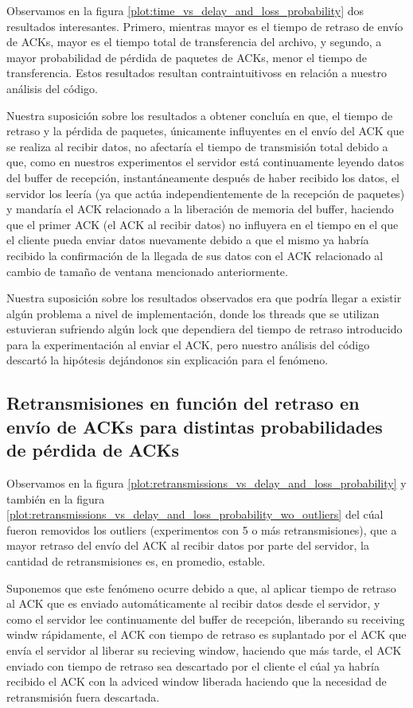 \documentclass[a4paper, 10pt, twoside]{article}
\begin{document}
Observamos en la figura \ref{plot:time_vs_delay_and_loss_probability} dos resultados interesantes. Primero, mientras mayor es el tiempo de retraso de envío de ACKs, mayor es el tiempo total de transferencia del archivo, y segundo, a mayor probabilidad de pérdida de paquetes de ACKs, menor el tiempo de transferencia. Estos resultados resultan contraintuitivoss en relación a nuestro análisis del código. 

Nuestra suposición sobre los resultados a obtener concluía en que, el tiempo de retraso y la pérdida de paquetes, únicamente influyentes en el envío del ACK que se realiza al recibir datos, no afectaría el tiempo de transmisión total debido a que, como en nuestros experimentos el servidor está continuamente leyendo datos del buffer de recepción, instantáneamente después de haber recibido los datos, el servidor los leería (ya que actúa independientemente de la recepción de paquetes) y mandaría el ACK relacionado a la liberación de memoria del buffer, haciendo que el primer ACK (el ACK al recibir datos) no influyera en el tiempo en el que el cliente pueda enviar datos nuevamente debido a que el mismo ya habría recibido la confirmación de la llegada de sus datos con el ACK relacionado al cambio de tamaño de ventana mencionado anteriormente.

Nuestra suposición sobre los resultados observados era que podría llegar a existir algún problema a nivel de implementación, donde los threads que se utilizan estuvieran sufriendo algún lock que dependiera del tiempo de retraso introducido para la experimentación al enviar el ACK, pero nuestro análisis del código descartó la hipótesis dejándonos sin explicación para el fenómeno.


\subsection{Retransmisiones en función del retraso en envío de ACKs para distintas probabilidades de pérdida de ACKs} \label{sec:retr_vs_delay_and_loss}

Observamos en la figura \ref{plot:retransmissions_vs_delay_and_loss_probability} y también en la figura \ref{plot:retransmissions_vs_delay_and_loss_probability_wo_outliers} del cúal fueron removidos los outliers (experimentos con 5 o más retransmisiones), que a mayor retraso del envío del ACK al recibir datos por parte del servidor, la cantidad de retransmisiones es, en promedio, estable.

Suponemos que este fenómeno ocurre debido a que, al aplicar tiempo de retraso al ACK que es enviado automáticamente al recibir datos desde el servidor, y como el servidor lee continuamente del buffer de recepción, liberando su receiving windw rápidamente, el ACK con tiempo de retraso es suplantado por el ACK que envía el servidor al liberar su recieving window, haciendo que más tarde, el ACK enviado con tiempo de retraso sea descartado por el cliente el cúal ya habría recibido el ACK con la adviced window liberada haciendo que la necesidad de retransmisión fuera descartada.
\end{document}
